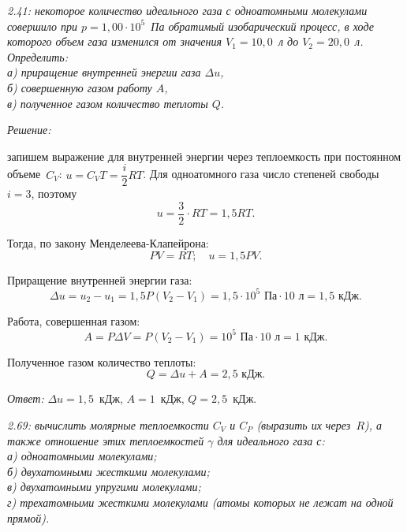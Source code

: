 \documentclass[pscyr]{hedwork}
\begin{document}
\maketitle


\emph{2.41: некоторое количество идеального газа с одноатомными молекулами
совершило при \( p = 1,\!00 \cdot 10^5 \)~Па обратимый изобарический процесс, в
ходе которого объем газа изменился от значения \( V_1 = 10,\!0 \)~л до
\( V_2 = 20,\!0 \)~л.\\Определить:\\
а) приращение внутренней энергии газа \( \Delta u \),\\
б) совершенную газом работу \( A \),\\
в) полученное газом количество теплоты \( Q \).}

\vspace*{2em}
\emph{Решение:}

запишем выражение для внутренней энергии через теплоемкость при постоянном
объеме~\( C_V \): \( u = C_V T = \dfrac{i}{2}RT \). Для одноатомного газа число
степеней свободы \( i = 3 \), поэтому
\[
    u = \frac{3}{2} \cdot RT = 1,\!5 RT.
\]

Тогда, по закону Менделеева-Клапейрона:
\[
    PV = RT; \quad u = 1,\!5 PV.
\]

Приращение внутренней энергии газа:
\[
    \Delta u = u_2 - u_1 = 1,\!5 P(V_2 - V_1) = 1,\!5 \cdot 10^5\text{ Па}
    \cdot 10\text{ л} = 1,\!5\text{ кДж}.
\]

Работа, совершенная газом:
\[
    A = P\Delta V = P(V_2 - V_1) = 10^5\text{ Па} \cdot 10\text{ л} =
    1\text{ кДж}.
\]

Полученное газом количество теплоты:
\[
    Q = \Delta u + A = 2,\!5\text{ кДж}.
\]

\vspace*{2em}
\emph{Ответ:} \( \Delta u = 1,\!5 \)~кДж, \( A = 1 \)~кДж, \( Q = 2,\!5 \)~кДж.

\newpage %

\emph{2.69: вычислить молярные теплоемкости \( C_V \) и \( C_P \)
(выразить их через~\( R \)), а также отношение этих теплоемкостей \( \gamma \)
для идеального газа с:\\
а) одноатомными молекулами;\\
б) двухатомными жесткими молекулами;\\
в) двухатомными упругими молекулами;\\
г) трехатомными жесткими молекулами (атомы которых не лежат на одной прямой).}
\end{document}
